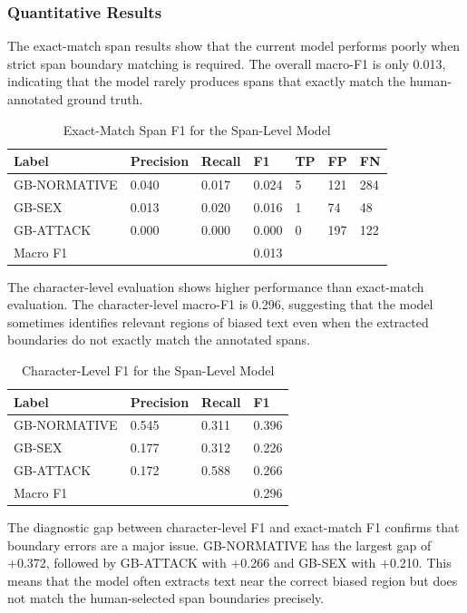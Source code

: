 \documentclass[12pt,oneside,openright,a4paper]{cpe-english-project}
\begin{document}
\subsubsection{Quantitative Results}

The exact-match span results show that the current model performs poorly when strict span boundary matching is required. The overall macro-F1 is only 0.013, indicating that the model rarely produces spans that exactly match the human-annotated ground truth.

\begin{table}[H]
\centering
\small
\caption{Exact-Match Span F1 for the Span-Level Model}
\begin{tabular}{@{}lllllll@{}}
\toprule
Label & Precision & Recall & F1 & TP & FP & FN \\
\midrule
GB-NORMATIVE & 0.040 & 0.017 & 0.024 & 5 & 121 & 284 \\
GB-SEX & 0.013 & 0.020 & 0.016 & 1 & 74 & 48 \\
GB-ATTACK & 0.000 & 0.000 & 0.000 & 0 & 197 & 122 \\
Macro F1 & ~ & ~ & 0.013 & ~ & ~ & ~ \\
\bottomrule
\end{tabular}
\end{table}

The character-level evaluation shows higher performance than exact-match evaluation. The character-level macro-F1 is 0.296, suggesting that the model sometimes identifies relevant regions of biased text even when the extracted boundaries do not exactly match the annotated spans.

\begin{table}[H]
\centering
\small
\caption{Character-Level F1 for the Span-Level Model}
\begin{tabular}{@{}llll@{}}
\toprule
Label & Precision & Recall & F1 \\
\midrule
GB-NORMATIVE & 0.545 & 0.311 & 0.396 \\
GB-SEX & 0.177 & 0.312 & 0.226 \\
GB-ATTACK & 0.172 & 0.588 & 0.266 \\
Macro F1 & ~ & ~ & 0.296 \\
\bottomrule
\end{tabular}
\end{table}

The diagnostic gap between character-level F1 and exact-match F1 confirms that boundary errors are a major issue. GB-NORMATIVE has the largest gap of +0.372, followed by GB-ATTACK with +0.266 and GB-SEX with +0.210. This means that the model often extracts text near the correct biased region but does not match the human-selected span boundaries precisely.
\end{document}
